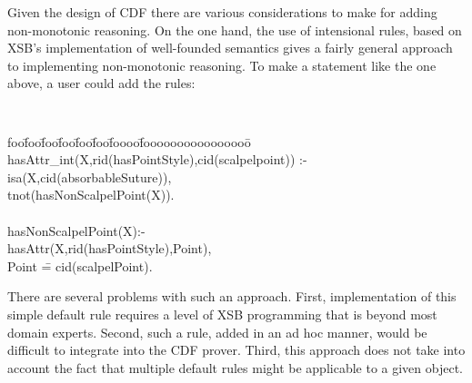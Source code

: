 Given the design of CDF there are various considerations to make for
adding non-monotonic reasoning.  On the one hand, the use of
intensional rules, based on XSB's implementation of well-founded
semantics gives a fairly general approach to implementing
non-monotonic reasoning.  To make a statement like the one above, a
user could add the rules: 
{\small {\tt 
\begin{tabbing}
foo\=foo\=foo\=foo\=foo\=foo\=foooo\=foooooooooooooooo\=\kill
\> hasAttr\_int(X,rid(hasPointStyle),cid(scalpelpoint)) :-  \\
\> \> isa(X,cid(absorbableSuture)), \\
\> \> tnot(hasNonScalpelPoint(X)). \\
\> \\
\> hasNonScalpelPoint(X):-  \\
\> \> 	hasAttr(X,rid(hasPointStyle),Point),  \\
\> \> 	Point \== cid(scalpelPoint).
\end{tabbing}
} }
%
\noindent
There are several problems with such an approach.  First,
implementation of this simple default rule requires a level of XSB
programming that is beyond most domain experts.  Second, such a rule,
added in an ad hoc manner, would be difficult to integrate into the
CDF prover.  Third, this approach does not take into account the fact
that multiple default rules might be applicable to a given object.

